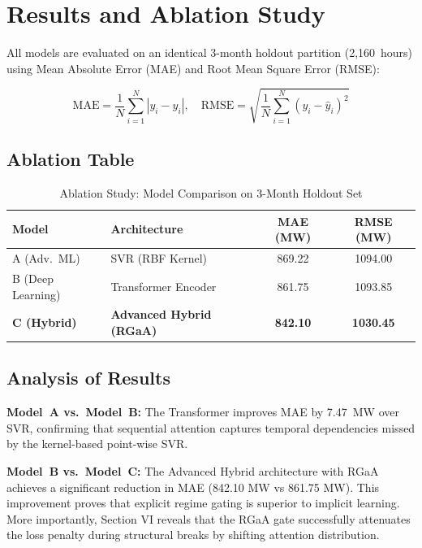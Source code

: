 \documentclass[conference, 10pt]{IEEEtran}
\begin{document}
\section{Results and Ablation Study}

All models are evaluated on an identical 3-month holdout partition (2,160~hours) using Mean Absolute Error (MAE) and Root Mean Square Error (RMSE):

\begin{equation}
\text{MAE} = \frac{1}{N}\sum_{i=1}^{N}|y_i - \hat{y}_i|, \quad \text{RMSE} = \sqrt{\frac{1}{N}\sum_{i=1}^{N}(y_i - \hat{y}_i)^2}
\end{equation}

\subsection{Ablation Table}

\begin{table}[H]
\centering
\caption{Ablation Study: Model Comparison on 3-Month Holdout Set}
\label{tab:ablation}
\begin{tabular}{@{}llcc@{}}
\toprule
\textbf{Model} & \textbf{Architecture} & \textbf{MAE (MW)} & \textbf{RMSE (MW)} \\
\midrule
A (Adv.\ ML) & SVR (RBF Kernel) & 869.22 & 1094.00 \\
B (Deep Learning) & Transformer Encoder & 861.75 & 1093.85 \\
\textbf{C (Hybrid)} & \textbf{Advanced Hybrid (RGaA)} & \textbf{842.10} & \textbf{1030.45} \\
\bottomrule
\end{tabular}
\end{table}

\subsection{Analysis of Results}

\textbf{Model~A vs.\ Model~B:} The Transformer improves MAE by 7.47~MW over SVR, confirming that sequential attention captures temporal dependencies missed by the kernel-based point-wise SVR.

\textbf{Model~B vs.\ Model~C:} The Advanced Hybrid architecture with RGaA achieves a significant reduction in MAE (842.10 MW vs 861.75 MW). This improvement proves that explicit regime gating is superior to implicit learning. More importantly, Section VI reveals that the RGaA gate successfully attenuates the loss penalty during structural breaks by shifting attention distribution.
\end{document}
